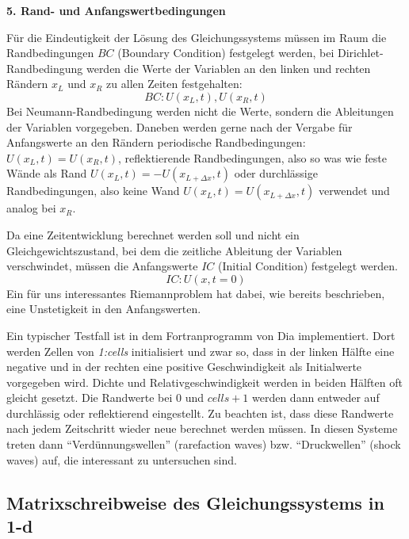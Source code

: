 {\bf 5. Rand- und Anfangswertbedingungen}

Für die Eindeutigkeit der Lösung des Gleichungssystems müssen im Raum
die Randbedingungen $BC$ (Boundary Condition) festgelegt werden, bei
Dirichlet-Randbedingung werden die Werte der Variablen an den linken
und rechten Rändern $x_L$ und $x_R$ zu allen Zeiten festgehalten:
\[
BC: U(x_L, t), U(x_R, t)
\]
Bei Neumann-Randbedingung werden nicht die Werte, sondern die
Ableitungen der Variablen vorgegeben. Daneben werden gerne nach der
Vergabe für Anfangswerte an den Rändern periodische Randbedingungen:
$U(x_L, t) = U(x_R, t)$, reflektierende Randbedingungen, also so was
wie feste Wände als Rand $U(x_L,t) = -U(x_{L+\Delta x},t)$ oder
durchlässige Randbedingungen, also keine Wand $U(x_L,t) =
U(x_{L+\Delta x},t)$ verwendet und analog bei $x_R$.

Da eine Zeitentwicklung berechnet werden soll und nicht ein
Gleichgewichtszustand, bei dem die zeitliche Ableitung der Variablen
verschwindet, müssen die Anfangswerte $IC$ (Initial Condition)
festgelegt werden. 
\[
IC:  U(x, t=0)
\]
Ein für uns interessantes Riemannproblem hat dabei, wie bereits
beschrieben, eine Unstetigkeit in den Anfangswerten. 

Ein typischer Testfall ist in dem Fortranprogramm von Dia
implementiert. Dort werden Zellen von {\it 1:cells} initialisiert und
zwar so, dass in der linken Hälfte eine negative und in der rechten
eine positive Geschwindigkeit als Initialwerte vorgegeben wird. Dichte
und Relativgeschwindigkeit werden in beiden Hälften oft gleicht gesetzt.
Die Randwerte bei $0$ und $cells+1$ werden dann entweder auf
durchlässig oder reflektierend eingestellt. Zu beachten ist, dass
diese Randwerte nach jedem Zeitschritt wieder neue berechnet werden
müssen. In diesen Systeme treten dann ``Verdünnungswellen''
(rarefaction waves) bzw. ``Druckwellen'' (shock waves) auf, die
interessant zu untersuchen sind.

\subsection{Matrixschreibweise des Gleichungssystems in 1-d}\label{sec:matrix_1d}

